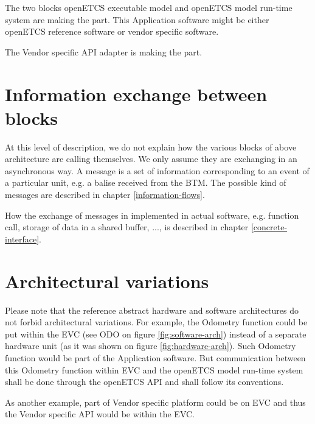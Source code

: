 The two blocks openETCS executable model and openETCS model run-time
system are making the  part. This
Application software might be either openETCS reference software or
vendor specific software.

The Vendor specific API adapter is making the 
part.

\section{Information exchange between blocks}

At this level of description, we do not explain how the various blocks
of above architecture are calling themselves. We only assume they are
exchanging  in an asynchronous way. A message is a set
of information corresponding to an event of a particular unit, e.g. a
balise received from the BTM. The possible kind of messages are
described in chapter \ref{information-flows}.

How the exchange of messages in implemented in actual software,
e.g. function call, storage of data in a shared buffer, ..., is
described in chapter \ref{concrete-interface}.

\section{Architectural variations}
Please note that the reference abstract hardware and software
architectures do not forbid architectural variations. For example, the
Odometry function could be put within the EVC (see ODO on figure
\ref{fig:software-arch}) instead of a separate hardware unit (as it
was shown on figure \ref{fig:hardware-arch}). Such Odometry function
would be part of the Application software. But communication between
this Odometry function within EVC and the openETCS model run-time
system shall be done through the openETCS API and shall follow its
conventions.

As another example, part of Vendor specific platform could be on EVC
and thus the Vendor specific API would be within the EVC.


